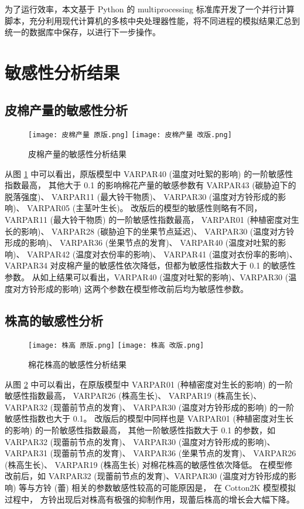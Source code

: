 为了运行效率，本文基于 Python 的 multiprocessing 标准库开发了一个并行计算脚本，充分利用现代计算机的多核中央处理器性能，将不同进程的模拟结果汇总到统一的数据库中保存，以进行下一步操作。


\section{敏感性分析结果}
\subsection{皮棉产量的敏感性分析}
\begin{figure}
    \centering
    \texttt{[image: 皮棉产量 原版.png]}
    \texttt{[image: 皮棉产量 改版.png]}
    \caption{皮棉产量的敏感性分析结果}\label{fig:saLintYield}
\end{figure}

从图 \ref{fig:saLintYield} 中可以看出，原版模型中 VARPAR40 (温度对吐絮的影响) 的一阶敏感性指数最高，%
其他大于 0.1 的影响棉花产量的敏感参数有
VARPAR43 (碳胁迫下的脱落强度)、%
VARPAR11 (最大铃干物质)、%
VARPAR30 (温度对方铃形成的影响)、%
VARPAR05 (主茎叶生长)。%
改版后的模型的敏感性则略有不同，%
VARPAR11 (最大铃干物质) 的一阶敏感性指数最高，%
VARPAR01 (种植密度对生长的影响)、%
VARPAR28 (碳胁迫下的坐果节点延迟)、%
VARPAR30 (温度对方铃形成的影响)、%
VARPAR36 (坐果节点的发育)、%
VARPAR40 (温度对吐絮的影响)、%
VARPAR42 (温度对衣份率的影响)、%
VARPAR41 (温度对衣份率的影响)、%
VARPAR34 对皮棉产量的敏感性依次降低，但都为敏感性指数大于 0.1 的敏感性参数。%
从如上结果可以看出，VARPAR40 (温度对吐絮的影响)、VARPAR30 (温度对方铃形成的影响) 这两个参数在模型修改前后均为敏感性参数。%

\subsection{株高的敏感性分析}
\begin{figure}
    \centering
    \texttt{[image: 株高 原版.png]}
    \texttt{[image: 株高 改版.png]}
    \caption{棉花株高的敏感性分析结果}\label{fig:saPlantHeight}
\end{figure}

从图 \ref{fig:saPlantHeight} 中可以看出，在原版模型中 VARPAR01 (种植密度对生长的影响) 的一阶敏感性指数最高，%
VARPAR26 (株高生长)、%
VARPAR19 (株高生长)、%
VARPAR32 (现蕾前节点的发育)、%
VARPAR30 (温度对方铃形成的影响) 的一阶敏感性指数也大于 0.1。%
改版后的模型中同样也是 VARPAR01 (种植密度对生长的影响) 的一阶敏感性指数最高，%
其他一阶敏感性指数大于 0.1 的参数，如 VARPAR32 (现蕾前节点的发育)、%
VARPAR30 (温度对方铃形成的影响)、%
VARPAR31 (现蕾前节点的发育)、%
VARPAR36 (坐果节点的发育)、%
VARPAR26 (株高生长)、%
VARPAR19 (株高生长) 对棉花株高的敏感性依次降低。%
在模型修改前后，如 VARPAR32 (现蕾前节点的发育)、VARPAR30 (温度对方铃形成的影响) 等与方铃 (蕾) 相关的参数敏感性较高的可能原因是，%
在 Cotton2K 模型模拟过程中，%
方铃出现后对株高有极强的抑制作用，现蕾后株高的增长会大幅下降。

